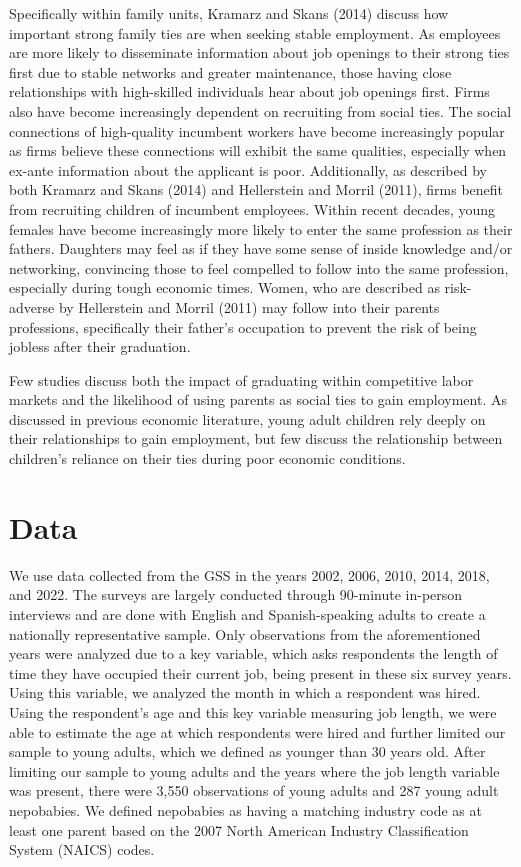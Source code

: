 \documentclass[12pt]{article}
\begin{document}
Specifically within family units, Kramarz and Skans (2014) discuss how important strong family ties are when seeking stable employment. As employees are more likely to disseminate information about job openings to their strong ties first due to stable networks and greater maintenance, those having close relationships with high-skilled individuals hear about job openings first. Firms also have become increasingly dependent on recruiting from social ties. The social connections of high-quality incumbent workers have become increasingly popular as firms believe these connections will exhibit the same qualities, especially when ex-ante information about the applicant is poor. Additionally, as described by both Kramarz and Skans (2014) and Hellerstein and Morril (2011), firms benefit from recruiting children of incumbent employees. Within recent decades, young females have become increasingly more likely to enter the same profession as their fathers. Daughters may feel as if they have some sense of inside knowledge and/or networking, convincing those to feel compelled to follow into the same profession, especially during tough economic times. Women, who are described as risk-adverse by Hellerstein and Morril (2011) may follow into their parents professions, specifically their father’s occupation to prevent the risk of being jobless after their graduation. 

Few studies discuss both the impact of graduating within competitive labor markets and the likelihood of using parents as social ties to gain employment. As discussed in previous economic literature, young adult children rely deeply on their relationships to gain employment, but few discuss the relationship between children’s reliance on their ties during poor economic conditions.


\section{Data}
\label{sec:data}
We use data collected from the GSS in the years 2002, 2006, 2010, 2014, 2018, and 2022. The surveys are largely conducted through 90-minute in-person interviews and are done with English and Spanish-speaking adults to create a nationally representative sample. Only observations from the aforementioned years were analyzed due to a key variable, which asks respondents the length of time they have occupied their current job, being present in these six survey years. Using this variable, we analyzed the month in which a respondent was hired. Using the respondent's age and this key variable measuring job length, we were able to estimate the age at which respondents were hired and further limited our sample to young adults, which we defined as younger than 30 years old. After limiting our sample to young adults and the years where the job length variable was present, there were 3,550 observations of young adults and 287 young adult nepobabies. We defined nepobabies as having a matching industry code as at least one parent based on the 2007 North American Industry Classification System (NAICS) codes. 
\end{document}

